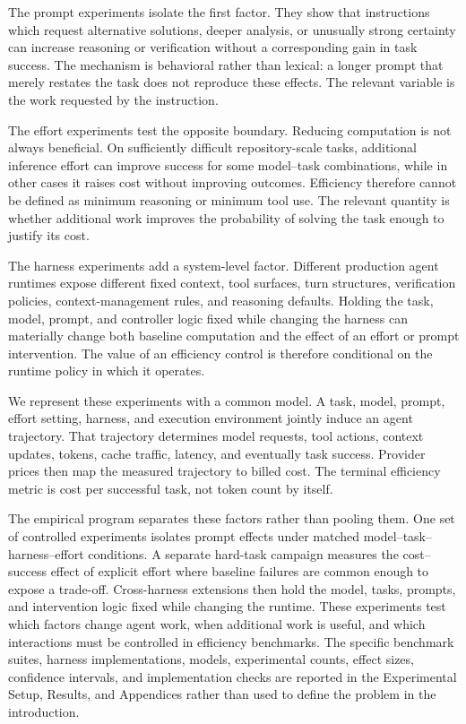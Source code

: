 \documentclass[11pt]{article}
\begin{document}
The prompt experiments isolate the first factor. They show that instructions
which request alternative solutions, deeper analysis, or unusually strong
certainty can increase reasoning or verification without a corresponding gain
in task success. The mechanism is behavioral rather than lexical: a longer
prompt that merely restates the task does not reproduce these effects. The
relevant variable is the work requested by the instruction.

The effort experiments test the opposite boundary. Reducing computation is not
always beneficial. On sufficiently difficult repository-scale tasks, additional
inference effort can improve success for some model--task combinations, while in
other cases it raises cost without improving outcomes. Efficiency therefore
cannot be defined as minimum reasoning or minimum tool use. The relevant
quantity is whether additional work improves the probability of solving the task
enough to justify its cost.

The harness experiments add a system-level factor. Different production agent
runtimes expose different fixed context, tool surfaces, turn structures,
verification policies, context-management rules, and reasoning defaults. Holding
the task, model, prompt, and controller logic fixed while changing the harness
can materially change both baseline computation and the effect of an effort or
prompt intervention. The value of an efficiency control is therefore conditional
on the runtime policy in which it operates.

We represent these experiments with a common model. A task, model, prompt,
effort setting, harness, and execution environment jointly induce an agent
trajectory. That trajectory determines model requests, tool actions, context
updates, tokens, cache traffic, latency, and eventually task success. Provider
prices then map the measured trajectory to billed cost. The terminal efficiency
metric is cost per successful task, not token count by itself.

The empirical program separates these factors rather than pooling them. One set
of controlled experiments isolates prompt effects under matched
model--task--harness--effort conditions. A separate hard-task campaign measures
the cost--success effect of explicit effort where baseline failures are common
enough to expose a trade-off. Cross-harness extensions then hold the model,
tasks, prompts, and intervention logic fixed while changing the runtime. These
experiments test which factors change agent work, when additional work is useful,
and which interactions must be controlled in efficiency benchmarks. The
specific benchmark suites, harness implementations, models, experimental counts,
effect sizes, confidence intervals, and implementation checks are reported in
the Experimental Setup, Results, and Appendices rather than used to define the
problem in the introduction.
\end{document}
